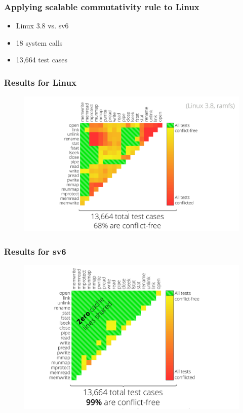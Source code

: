 \documentclass{beamer}
\begin{document}
\begin{frame}
\frametitle{Applying scalable commutativity rule to Linux}
\begin{itemize}
\item Linux 3.8 vs. sv6
\item 18 system calls
\item 13,664 test cases
\end{itemize}
\end{frame}

\begin{frame}
\frametitle{Results for Linux}
\begin{figure}
   \includegraphics[width=\textwidth]{799-s14-docs/linux_result.png}
 \end{figure}
\end{frame}

\begin{frame}
\frametitle{Results for sv6}
\begin{figure}
   \includegraphics[width=\textwidth]{799-s14-docs/sv6_result.png}
 \end{figure}
\end{frame}
\end{document}
